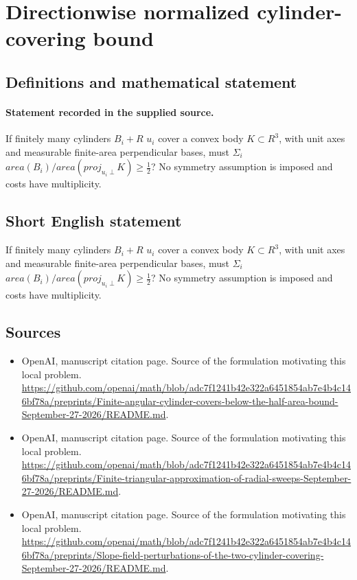 \documentclass[11pt]{article}
\begin{document}
\section*{Directionwise normalized cylinder-covering bound}\label{statement}
\subsection{Definitions and mathematical statement}
\paragraph{Statement recorded in the supplied source.}
If finitely many cylinders $B_i+R$ $u_i$ cover a convex body $K\subset R^{3}$, with unit axes and measurable finite-area perpendicular bases, must $\Sigma _i$ $area(B_i)/area(proj_{u_i\perp }K)\geq \tfrac12 $? No symmetry assumption is imposed and costs have multiplicity.
\subsection{Short English statement}
If finitely many cylinders $B_i+R$ $u_i$ cover a convex body $K\subset R^{3}$, with unit axes and measurable finite-area perpendicular bases, must $\Sigma _i$ $area(B_i)/area(proj_{u_i\perp }K)\geq \tfrac12 $? No symmetry assumption is imposed and costs have multiplicity.
\subsection{Sources}
\begin{itemize}
\item[S1] OpenAI, manuscript citation page. Source of the formulation motivating this local problem.
\url{https://github.com/openai/math/blob/adc7f1241b42e322a6451854ab7e4b4c146bf78a/preprints/Finite-angular-cylinder-covers-below-the-half-area-bound-September-27-2026/README.md}.
\item[S2] OpenAI, manuscript citation page. Source of the formulation motivating this local problem.
\url{https://github.com/openai/math/blob/adc7f1241b42e322a6451854ab7e4b4c146bf78a/preprints/Finite-triangular-approximation-of-radial-sweeps-September-27-2026/README.md}.
\item[S3] OpenAI, manuscript citation page. Source of the formulation motivating this local problem.
\url{https://github.com/openai/math/blob/adc7f1241b42e322a6451854ab7e4b4c146bf78a/preprints/Slope-field-perturbations-of-the-two-cylinder-covering-September-27-2026/README.md}.
\end{itemize}
\end{document}
